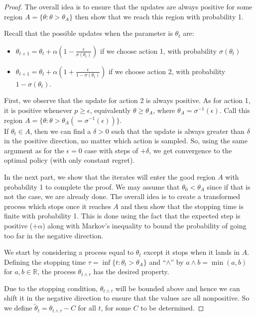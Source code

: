 \begin{proof}

The overall idea is to ensure that the updates are always positive for some region $ A = \{\theta: \theta > \theta_A\}$ then show that we reach this region with probability 1. 

Recall that the possible updates when the parameter is $\theta_t$ are:
\begin{itemize}
    \item $\theta_{t+1} = \theta_t + \alpha(1-\frac{\epsilon}{\sigma(\theta_t)})$ if we choose action 1, with probability $\sigma(\theta_t)$ 
    \item $\theta_{t+1} = \theta_t + \alpha(1+\frac{\epsilon}{1- \sigma(\theta_t)})$ if we choose action 2, with probability $1-\sigma(\theta_t)$.
\end{itemize}

First, we observe that the update for action 2 is always positive. As for action 1, it is positive whenever $p \ge \epsilon$, equivalently $\theta \ge \theta_A$, where $\theta_A = \sigma^{-1}(\epsilon)$. Call this region $A = \{ \theta: \theta > \theta_A (= \sigma^{-1}(\epsilon)) \}$. \\
If $\theta_t \in A$, then we can find a $\delta > 0$ such that the update is always greater than $\delta$ in the positive direction, no matter which action is sampled. 
So, using the same argument as for the $\epsilon = 0$ case with steps of $+\delta$, we get convergence to the optimal policy (with only constant regret).

In the next part, we show that the iterates will enter the good region $A$ with probability 1 to complete the proof. We may assume that $\theta_0 < \theta_A$ since if that is not the case, we are already done. 
The overall idea is to create a transformed process which stops once it reaches $A$ and then show that the stopping time is finite with probability 1. This is done using the fact that the expected step is positive ($+\alpha$) along with Markov's inequality to bound the probability of going too far in the negative direction.

We start by considering a process equal to $\theta_t$ except it stops when it lands in $A$. Defining the stopping time $\tau = \inf \{t : \theta_t > \theta_A \}$ and ``$\land$'' by $a \land b = \min(a,b)$ for $a, b \in \mathbb{R}$, the process $\theta_{t \land \tau}$ has the desired property.

Due to the stopping condition, $\theta_{t \land \tau}$ will be bounded above and hence we can shift it in the negative direction to ensure that the values are all nonpositive. So we define $\tilde{\theta}_t = \theta_{t \land \tau} - C$ for all $t$, for some $C$ to be determined. 


\end{proof}
